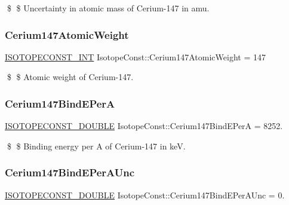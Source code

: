 \$ \$ Uncertainty in atomic mass of Cerium-\/147 in amu. \mbox{\label{group___isotope_const-_cerium-_ce147_ga58f5cdf0fd482279b9d9203b3961497d}} 
\subsubsection{\texorpdfstring{Cerium147\+Atomic\+Weight}{Cerium147AtomicWeight}}
{\footnotesize\ttfamily \mbox{\hyperlink{group___isotope_const-_macros_ga5f18360b3e99483a35c32d789e62621c}{I\+S\+O\+T\+O\+P\+E\+C\+O\+N\+S\+T\+\_\+\+I\+NT}} Isotope\+Const\+::\+Cerium147\+Atomic\+Weight = 147}

\$ \$ Atomic weight of Cerium-\/147. \mbox{\label{group___isotope_const-_cerium-_ce147_gaa676923faaaf745c5b19a1d7c884ae37}} 
\subsubsection{\texorpdfstring{Cerium147\+Bind\+E\+PerA}{Cerium147BindEPerA}}
{\footnotesize\ttfamily \mbox{\hyperlink{group___isotope_const-_macros_ga8f45a7272ce02c0b4c65c44636ed719a}{I\+S\+O\+T\+O\+P\+E\+C\+O\+N\+S\+T\+\_\+\+D\+O\+U\+B\+LE}} Isotope\+Const\+::\+Cerium147\+Bind\+E\+PerA = 8252.}

\$ \$ Binding energy per A of Cerium-\/147 in keV. \mbox{\label{group___isotope_const-_cerium-_ce147_ga120346962357aa75340ddef4fc71e826}} 
\subsubsection{\texorpdfstring{Cerium147\+Bind\+E\+Per\+A\+Unc}{Cerium147BindEPerAUnc}}
{\footnotesize\ttfamily \mbox{\hyperlink{group___isotope_const-_macros_ga8f45a7272ce02c0b4c65c44636ed719a}{I\+S\+O\+T\+O\+P\+E\+C\+O\+N\+S\+T\+\_\+\+D\+O\+U\+B\+LE}} Isotope\+Const\+::\+Cerium147\+Bind\+E\+Per\+A\+Unc = 0.}

